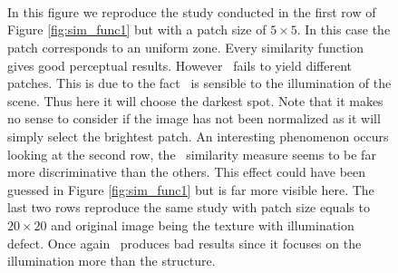 \begin{figure}[H]
  \centering
   \hfill
   \hfill
   \hfill
   \hfill
   \hfill \\
   \hfill
   \hfill
   \hfill
   \hfill
   \hfill \\
     \hfill
   \hfill
   \hfill
   \hfill
   \hfill \\
   \hfill
   \hfill
   \hfill
   \hfill
   \hfill
  \caption{In this figure we reproduce the study conducted in the first row of Figure \ref{fig:sim_func1} but with a patch size of $5 \times 5$. In this case the patch corresponds to an uniform zone. Every similarity function gives good perceptual results. However \sps \ fails to yield different patches. This is due to the fact \sps \ is sensible to the illumination of the scene. Thus here it will choose the darkest spot. Note that it makes no sense to consider \sps if the image has not been normalized as it will simply select the brightest patch. An interesting phenomenon occurs looking at the second row, the \scos \ similarity measure seems to be far more discriminative than the others. This effect could have been guessed in Figure \ref{fig:sim_func1} but is far more visible here. The last two rows reproduce the same study with patch size equals to $20 \times 20$ and original image being the texture with illumination defect. Once again \sps \ produces bad results since it focuses on the illumination more than the structure.}
  \label{fig:sim_func2}
\end{figure}
